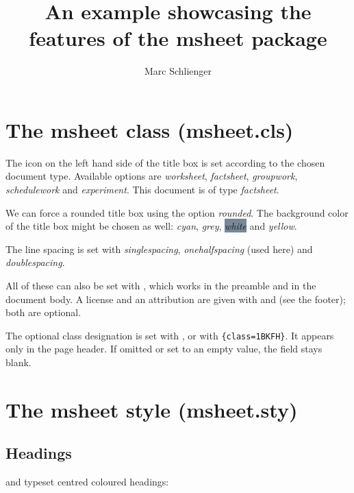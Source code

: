 \documentclass[factsheet, white, rounded, onehalfspacing, 11pt, a4paper]{msheet}
\title{An example showcasing the features of the msheet package}
\author{Marc Schlienger}
\newcommand{\commandToText}[1]{\texttt{\string#1}}
\begin{document}
\maketitle

\section{The msheet class (msheet.cls)}

The icon on the left hand side of the title box is set according to the chosen
document type. Available options are \textit{\color{FireBrick}worksheet},
\textit{\color{FireBrick}factsheet}, \textit{\color{FireBrick}groupwork},
\textit{\color{FireBrick}schedulework} and \textit{\color{FireBrick}experiment}.
This document is of type \textit{\color{FireBrick}factsheet}.

We can force a rounded title box using the option
\textit{\color{FireBrick}rounded}. The background color of the title box might
be chosen as well: \textit{\color{DarkCyan}cyan},
\textit{\color{LightSlateGray}grey},
\colorbox{LightSlateGray}{\textit{\color{white}white}} and
\textit{\color{Yellow}yellow}.

The line spacing is set with \textit{\color{FireBrick}singlespacing},
\textit{\color{FireBrick}onehalfspacing} (used here) and
\textit{\color{FireBrick}doublespacing}.

All of these can also be set with \commandToText{\msheetsetup}, which works in
the preamble and in the document body. A license and an attribution are given
with \commandToText{\license} and \commandToText{\attribution} (see the
footer); both are optional.

The optional class designation is set with \commandToText{\class}, or with
\texttt{\string\msheetsetup\{class=1BKFH\}}. It appears only in the page
header. If omitted or set to an empty value, the field stays blank.

\section{The msheet style (msheet.sty)}

\subsection{Headings}

\commandToText{\mchapter} and \commandToText{\mtestpart} typeset centred
coloured headings:

\end{document}
